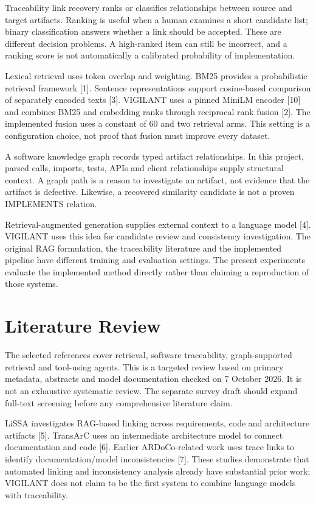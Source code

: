 \documentclass[
  11pt,
  a4paper,
]{report}
\begin{document}
Traceability link recovery ranks or classifies relationships between
source and target artifacts. Ranking is useful when a human examines a
short candidate list; binary classification answers whether a link
should be accepted. These are different decision problems. A high-ranked
item can still be incorrect, and a ranking score is not automatically a
calibrated probability of implementation.

Lexical retrieval uses token overlap and weighting. BM25 provides a
probabilistic retrieval framework {[}1{]}. Sentence representations
support cosine-based comparison of separately encoded texts {[}3{]}.
VIGILANT uses a pinned MiniLM encoder {[}10{]} and combines BM25 and
embedding ranks through reciprocal rank fusion {[}2{]}. The implemented
fusion uses a constant of 60 and two retrieval arms. This setting is a
configuration choice, not proof that fusion must improve every dataset.

A software knowledge graph records typed artifact relationships. In this
project, parsed calls, imports, tests, APIs and client relationships
supply structural context. A graph path is a reason to investigate an
artifact, not evidence that the artifact is defective. Likewise, a
recovered similarity candidate is not a proven IMPLEMENTS relation.

Retrieval-augmented generation supplies external context to a language
model {[}4{]}. VIGILANT uses this idea for candidate review and
consistency investigation. The original RAG formulation, the
traceability literature and the implemented pipeline have different
training and evaluation settings. The present experiments evaluate the
implemented method directly rather than claiming a reproduction of those
systems.

\hypertarget{literature-review}{%
\chapter{Literature Review}\label{literature-review}}

The selected references cover retrieval, software traceability,
graph-supported retrieval and tool-using agents. This is a targeted
review based on primary metadata, abstracts and model documentation
checked on 7 October 2026. It is not an exhaustive systematic review.
The separate survey draft should expand full-text screening before any
comprehensive literature claim.

LiSSA investigates RAG-based linking across requirements, code and
architecture artifacts {[}5{]}. TransArC uses an intermediate
architecture model to connect documentation and code {[}6{]}. Earlier
ARDoCo-related work uses trace links to identify documentation/model
inconsistencies {[}7{]}. These studies demonstrate that automated
linking and inconsistency analysis already have substantial prior work;
VIGILANT does not claim to be the first system to combine language
models with traceability.
\end{document}
